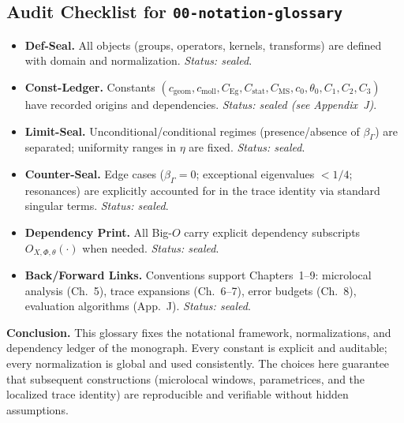 \subsection*{Audit Checklist for \texttt{00-notation-glossary}}

\begin{itemize}
  \item \textbf{Def-Seal.} All objects (groups, operators, kernels, transforms) are defined with domain and normalization. \emph{Status: sealed}.
  \item \textbf{Const-Ledger.} Constants $(c_{\mathrm{geom}},c_{\mathrm{moll}},C_{\mathrm{Eg}},C_{\mathrm{stat}},C_{\mathrm{MS}},c_0,\theta_0,C_1,C_2,C_3)$ have recorded origins and dependencies. \emph{Status: sealed (see Appendix~J)}.
  \item \textbf{Limit-Seal.} Unconditional/conditional regimes (presence/absence of $\beta_\Gamma$) are separated; uniformity ranges in $\eta$ are fixed. \emph{Status: sealed}.
  \item \textbf{Counter-Seal.} Edge cases ($\beta_\Gamma=0$; exceptional eigenvalues $<1/4$; resonances) are explicitly accounted for in the trace identity via standard singular terms. \emph{Status: sealed}.
  \item \textbf{Dependency Print.} All Big-$O$ carry explicit dependency subscripts $O_{X,\Phi,\theta}(\cdot)$ when needed. \emph{Status: sealed}.
  \item \textbf{Back/Forward Links.} Conventions support Chapters~1--9: microlocal analysis (Ch.~5), trace expansions (Ch.~6--7), error budgets (Ch.~8), evaluation algorithms (App.~J). \emph{Status: sealed}.
\end{itemize}

\medskip
\noindent\textbf{Conclusion.}
This glossary fixes the notational framework, normalizations, and dependency ledger of the monograph.
Every constant is explicit and auditable; every normalization is global and used consistently.
The choices here guarantee that subsequent constructions (microlocal windows, parametrices, and the localized trace identity)
are reproducible and verifiable without hidden assumptions.

